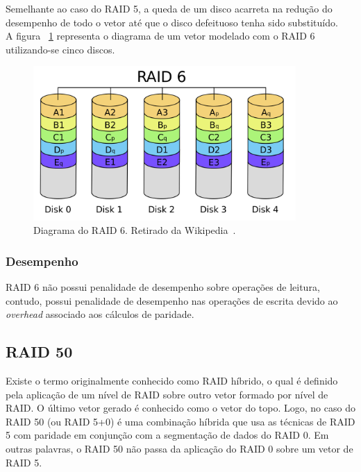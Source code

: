 		Semelhante ao caso do RAID 5, a queda de um disco acarreta na redução do desempenho de todo o vetor até que o disco defeituoso tenha sido substituído.\\

		
		A figura ~\ref{fig:raid6} representa o diagrama de um vetor modelado com o RAID 6 utilizando-se cinco discos.\\
		
		\begin{figure}[htb]
			\begin{center}
				
				\includegraphics[clip,width=10.0cm]{images/RAID_6.png}
				\caption{Diagrama do RAID 6. Retirado da Wikipedia~\citep{wikiRAIDlevels}.}
				\label{fig:raid6}
			\end{center}
		\end{figure} 
		
		\subsubsection{Desempenho}
		RAID 6 não possui penalidade de desempenho sobre operações de leitura, contudo, possui penalidade de desempenho nas operações de escrita devido ao \textit{overhead} associado aos cálculos de paridade.\\
		
		
		\subsection{RAID 50}
		Existe o termo originalmente conhecido como RAID híbrido, o qual é definido pela aplicação de um nível de RAID sobre outro vetor formado por nível de RAID. O último vetor gerado é conhecido como o 
		vetor do topo. Logo, no caso do RAID 50 (ou RAID 5+0) é uma combinação híbrida que usa as técnicas de RAID 5 com paridade em conjunção com a segmentação de dados do RAID 0. Em outras palavras, o RAID 50 não passa da aplicação do RAID 0 sobre um vetor de RAID 5. \\
		
